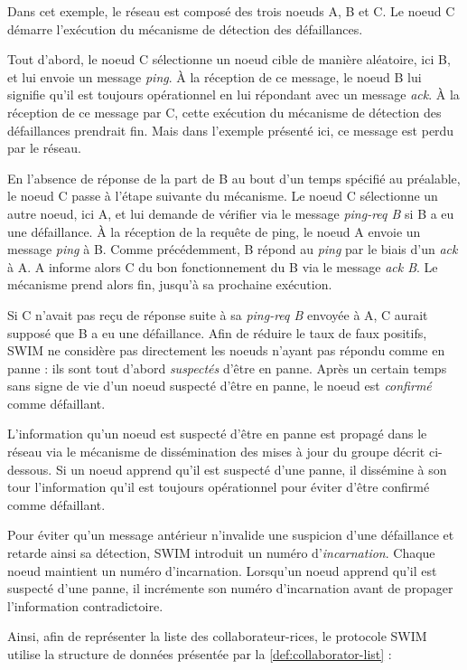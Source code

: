 Dans cet exemple, le réseau est composé des trois noeuds A, B et C.
Le noeud C démarre l'exécution du mécanisme de détection des défaillances.

Tout d'abord, le noeud C sélectionne un noeud cible de manière aléatoire, ici B, et lui envoie un message \emph{ping}.
À la réception de ce message, le noeud B lui signifie qu'il est toujours opérationnel en lui répondant avec un message \emph{ack}.
À la réception de ce message par C, cette exécution du mécanisme de détection des défaillances prendrait fin.
Mais dans l'exemple présenté ici, ce message est perdu par le réseau.

En l'absence de réponse de la part de B au bout d'un temps spécifié au préalable, le noeud C passe à l'étape suivante du mécanisme.
Le noeud C sélectionne un autre noeud, ici A, et lui demande de vérifier via le message \emph{ping-req B} si B a eu une défaillance.
À la réception de la requête de ping, le noeud A envoie un message \emph{ping} à B.
Comme précédemment, B répond au \emph{ping} par le biais d'un \emph{ack} à A.
A informe alors C du bon fonctionnement du B via le message \emph{ack B}.
Le mécanisme prend alors fin, jusqu'à sa prochaine exécution.

Si C n'avait pas reçu de réponse suite à sa \emph{ping-req B} envoyée à A, C aurait supposé que B a eu une défaillance.
Afin de réduire le taux de faux positifs, SWIM ne considère pas directement les noeuds n'ayant pas répondu comme en panne : ils sont tout d'abord \emph{suspectés} d'être en panne.
Après un certain temps sans signe de vie d'un noeud suspecté d'être en panne, le noeud est \emph{confirmé} comme défaillant.

L'information qu'un noeud est suspecté d'être en panne est propagé dans le réseau via le mécanisme de dissémination des mises à jour du groupe décrit ci-dessous.
Si un noeud apprend qu'il est suspecté d'une panne, il dissémine à son tour l'information qu'il est toujours opérationnel pour éviter d'être confirmé comme défaillant.

Pour éviter qu'un message antérieur n'invalide une suspicion d'une défaillance et retarde ainsi sa détection, SWIM introduit un numéro d'\emph{incarnation}.
Chaque noeud maintient un numéro d'incarnation.
Lorsqu'un noeud apprend qu'il est suspecté d'une panne, il incrémente son numéro d'incarnation avant de propager l'information contradictoire.

Ainsi, afin de représenter la liste des collaborateur-rices, le protocole SWIM utilise la structure de données présentée par la \autoref{def:collaborator-list} :

